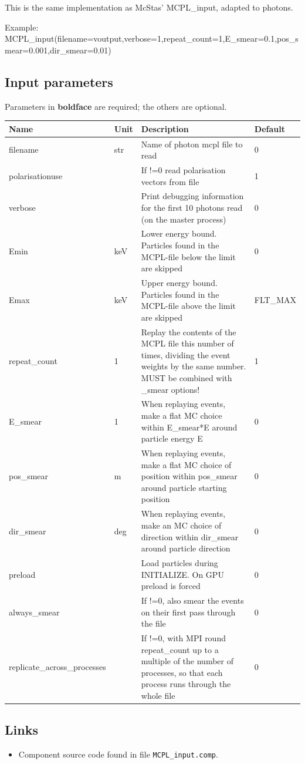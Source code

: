 This is the same implementation as McStas' MCPL\_input, adapted to photons.

Example: MCPL\_input(filename=voutput,verbose=1,repeat\_count=1,E\_smear=0.1,pos\_smear=0.001,dir\_smear=0.01)

\subsection*{Input parameters}
Parameters in \textbf{boldface} are required; the others are optional.

\begin{longtable}{p{}p{}p{}p{}}
\toprule
\textbf{Name} & \textbf{Unit} & \textbf{Description} & \textbf{Default} \\
\midrule
\endhead
filename & str & Name of photon mcpl file to read & 0 \\
polarisationuse &   & If !=0 read polarisation vectors from file & 1 \\
verbose &   & Print debugging information for the first 10 photons read (on the master process) & 0 \\
Emin & keV & Lower energy bound. Particles found in the MCPL-file below the limit are skipped & 0 \\
Emax & keV & Upper energy bound. Particles found in the MCPL-file above the limit are skipped & FLT\_MAX \\
repeat\_count & 1 & Replay the contents of the MCPL file this number of times, dividing the event weights by the same number. MUST be combined with \_smear options! & 1 \\
E\_smear & 1 & When replaying events, make a flat MC choice within E\_smear*E around particle energy E & 0 \\
pos\_smear & m & When replaying events, make a flat MC choice of position within pos\_smear around particle starting position & 0 \\
dir\_smear & deg & When replaying events, make an MC choice of direction within dir\_smear around particle direction & 0 \\
preload &   & Load particles during INITIALIZE. On GPU preload is forced & 0 \\
always\_smear &   & If !=0, also smear the events on their first pass through the file & 0 \\
replicate\_across\_processes &   & If !=0, with MPI round repeat\_count up to a multiple of the number of processes, so that each process runs through the whole file & 0 \\
\bottomrule
\end{longtable}

\subsection*{Links}
\begin{itemize}
  \item Component source code found in file \texttt{MCPL\_input.comp}.
\end{itemize}
